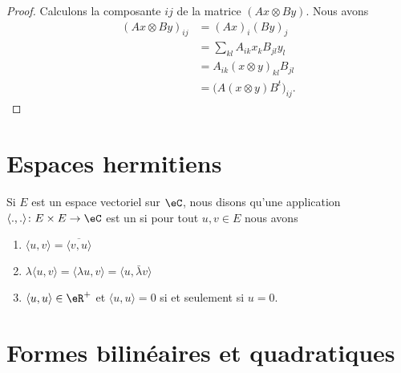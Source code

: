 \begin{proof}
    Calculons la composante \( ij\) de la matrice \( (Ax\otimes By)\). Nous avons
    \begin{subequations}
        \begin{align}
            (Ax\otimes By)_{ij}&=(Ax)_i(By)_j\\
            &=\sum_{kl}A_{ik}x_kB_{jl}y_l\\
            &=A_{ik}(x\otimes y)_{kl}B_{jl}\\
            &=\big( A(x\otimes y)B^t \big)_{ij}.
        \end{align}
    \end{subequations}
\end{proof}

\section{Espaces hermitiens}

\begin{definition}  \label{DefMZQxmQ}
Si \( E\) est un espace vectoriel sur \( \eC\), nous disons qu'une application \( \langle ., .\rangle \colon E\times E\to \eC\) est un  si pour tout \( u,v\in E\) nous avons
\begin{enumerate}
    \item
        \( \langle u, v\rangle =\overline{ \langle v, u\rangle  }\)
    \item
        \( \lambda\langle u, v\rangle =\langle \lambda u, v\rangle =\langle u, \bar \lambda v\rangle \)
    \item
        \( \langle u, u\rangle \in \eR^+\) et \( \langle u, u\rangle =0\) si et seulement si \( u=0\).
\end{enumerate}
\end{definition}

\section{Formes bilinéaires et quadratiques}

